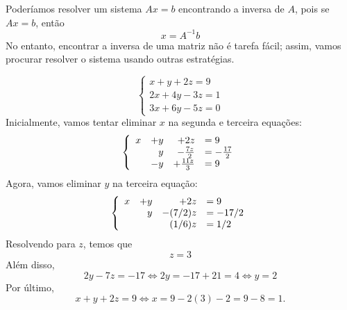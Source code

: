 Poderíamos resolver um sistema $Ax=b$ encontrando a inversa de $A$, pois se $Ax=b$, então
\begin{equation*}
	x = A^{-1}b
\end{equation*}
No entanto, encontrar a inversa de uma matriz não é tarefa fácil; assim, vamos procurar resolver o sistema usando outras estratégias.
\begin{exemplo*}
	\begin{equation*}
		\begin{cases} 
        	x+y+2z = 9\\ 
            2x+4y-3z = 1\\ 
            3x+6y-5z = 0 
        \end{cases}
	\end{equation*}
	Inicialmente, vamos tentar eliminar $x$ na segunda e terceira equações:
	\begin{equation*}
    	\left\{
		\begin{array}{r r r l}
			x &+ y &+ 2z  &=  9\\ 
			  & y &- \frac{7z}{2}  &=  -\frac{17}{2}\\ 
			  &-y &+ \frac{11z}{3} &= 9 
		\end{array}
        \right.
	\end{equation*}
	Agora, vamos eliminar $y$ na terceira equação:
	\begin{equation*}
		\left\{ 
		\begin{array}{r r r l}
			x&+y &+ 2z &= 9\\ 
			 & y &-(7/2)z &= -17/2\\ 
			 &   & (1/6)z &= 1/2 
		\end{array} 
		\right.
	\end{equation*}
	Resolvendo para $z$, temos que 
	\begin{equation*}
    	z = 3
    \end{equation*}
	Além disso,
	\begin{equation*}
    	2y - 7z = -17 \Leftrightarrow 2y = -17+21 = 4 \Leftrightarrow y = 2
    \end{equation*}
	Por último,
	\begin{equation*}
    	x+y+2z = 9 \Leftrightarrow x = 9 -2(3)-2 = 9-8 = 1.
    \end{equation*}
\end{exemplo*}

